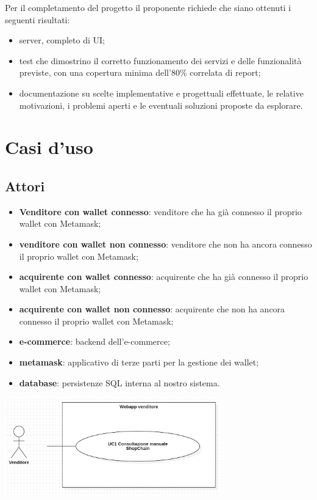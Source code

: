 \documentclass[a4paper, 12pt]{article}
\begin{document}
Per il completamento del progetto il proponente richiede che siano ottenuti i seguenti risultati:
\begin{itemize}
\item server, completo di UI;
\item test che dimostrino il corretto funzionamento dei servizi e delle funzionalità previste, con una copertura minima dell'80\% correlata di report;
\item documentazione su scelte implementative e progettuali effettuate, le relative motivazioni, i problemi aperti e le eventuali soluzioni proposte da esplorare.
\end{itemize}

\section{Casi d'uso}
\subsection{Attori}
\begin{itemize}
\item \textbf{Venditore con wallet connesso}: venditore che ha già connesso il proprio wallet con Metamask;
\item \textbf{venditore con wallet non connesso}: venditore che non ha ancora connesso il proprio wallet con Metamask;
\item \textbf{acquirente con wallet connesso}: acquirente che ha già connesso il proprio wallet con Metamask;
\item \textbf{acquirente con wallet non connesso}: acquirente che non ha ancora connesso il proprio wallet con Metamask;
\item \textbf{e-commerce}: backend dell'e-commerce;
\item \textbf{metamask}: applicativo di terze parti per la gestione dei wallet;
\item \textbf{database}: persistenze SQL interna al nostro sistema.
\end{itemize}

\includegraphics[width=0.7\textwidth]{UC_WAV1}
\end{document}
